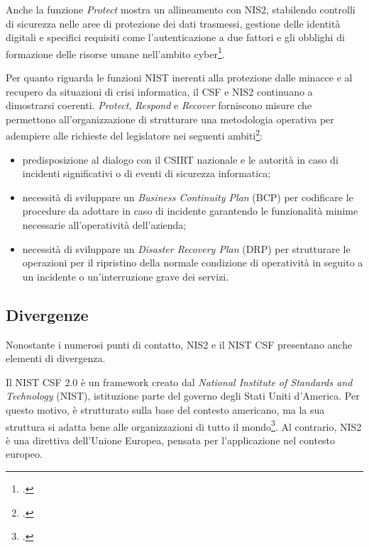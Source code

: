 Anche la funzione \textit{Protect} mostra un allineamento con NIS2, stabilendo controlli di sicurezza nelle aree di protezione
dei dati trasmessi, gestione delle identità digitali e specifici requisiti come l'autenticazione a due fattori e gli obblighi di
formazione delle risorse umane nell'ambito cyber\footcite[p. 4]{parmar-miles-csf}.

Per quanto riguarda le funzioni NIST inerenti alla protezione dalle minacce e al recupero da situazioni di crisi informatica,
il CSF e NIS2 continuano a dimostrarsi coerenti. \textit{Protect}, \textit{Respond} e \textit{Recover} forniscono misure che 
permettono all'organizzazione di strutturare una metodologia operativa per adempiere alle richieste del legislatore nei seguenti ambiti\footcite[p. 4]{parmar-miles-csf}:
\begin{itemize}
    \item predisposizione al dialogo con il CSIRT nazionale e le autorità in caso di incidenti significativi o di eventi di sicurezza informatica;
    \item necessità di sviluppare un \textit{Business Continuity Plan} (BCP) per codificare le procedure da adottare in caso di incidente 
    garantendo le funzionalità minime necessarie all'operatività dell'azienda;
    \item necessità di sviluppare un \textit{Disaster Recovery Plan} (DRP) per strutturare le operazioni per il ripristino della normale
    condizione di operatività in seguito a un incidente o un'interruzione grave dei servizi.
\end{itemize} 


\subsection{Divergenze}
Nonostante i numerosi punti di contatto, NIS2 e il NIST CSF presentano anche elementi di divergenza.

Il NIST CSF 2.0 è un framework creato dal \textit{National Institute of Standards and Technology} (NIST),
istituzione parte del governo degli Stati Uniti d'America. Per questo motivo, è strutturato sulla base del 
contesto americano, ma la sua struttura si adatta bene alle organizzazioni di tutto il mondo\footcite[pp. 1--3]{parmar-miles-csf}.
Al contrario, NIS2 è una direttiva dell'Unione Europea, pensata per l'applicazione nel contesto europeo. 

